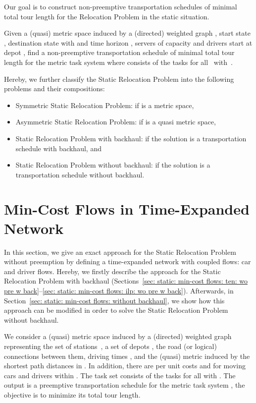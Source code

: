 \documentclass[english]{llncs}
\numberwithin{sublemma}{lemma}
\begin{document}
Our goal is to construct non-preemptive transportation schedules of minimal total tour length for the Relocation Problem in the static situation.


\begin{problem}
Given a (quasi) metric space  induced by a (directed) weighted graph ,
start state , destination state  with  and time horizon ,  servers of capacity  and  drivers start at depot ,
find a non-preemptive transportation schedule of minimal total tour length for the metric task system  where  consists of the tasks  for all~ with~.

Hereby, we further classify the Static Relocation Problem into the following problems and their compositions:
\begin{itemize}
 \item Symmetric Static Relocation Problem: if  is a metric space,
 \item Asymmetric Static Relocation Problem: if  is a quasi metric space,
 \item Static Relocation Problem with backhaul: if the solution is a transportation schedule with backhaul, and
 \item Static Relocation Problem without backhaul: if the solution is a transportation schedule without backhaul.
\end{itemize}
\end{problem}






\section{Min-Cost Flows in Time-Expanded Network}
\label{sec: static: min-cost flows: wo pre w back}


In this section, we give an exact approach for the Static Relocation Problem  without preemption by defining a time-expanded network with coupled flows: car and driver flows.
Hereby, we firstly describe the approach for the Static Relocation Problem with backhaul (Sections~\ref{sec: static: min-cost flows: ten: wo pre w back}--\ref{sec: static: min-cost flows: ilp: wo pre w back}).
Afterwards, in Section~\ref{sec: static: min-cost flows: without backhaul}, we show how this approach can be modified in order to solve the Static Relocation Problem without backhaul.



We consider a (quasi) metric space  induced by a (directed) weighted graph  representing the set of stations~, a set of depots ,
the road (or logical) connections  between them, driving times , and the (quasi) metric  induced by the shortest path distances in . 
In addition, there are per unit costs  and  for moving cars and drivers within . 
The task set  consists of the tasks  for all  with . 
The output is a preemptive transportation schedule for the metric task system , the objective is to minimize its total tour length.
\end{document}
